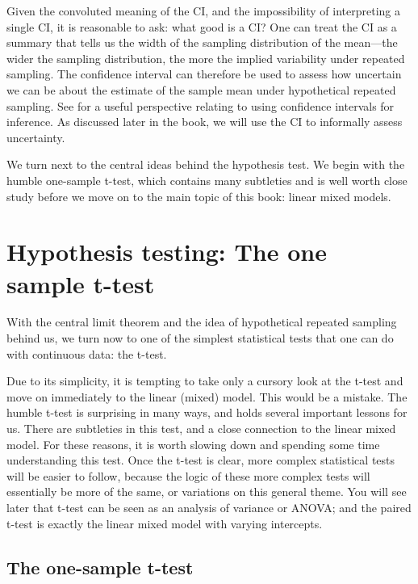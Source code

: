 \documentclass[12pt,]{krantz}
\begin{document}
Given the convoluted meaning of the CI, and the impossibility of interpreting a single CI, it is reasonable to ask: what good is a CI? One can treat the CI as a summary that tells us the width of the sampling distribution of the mean---the wider the sampling distribution, the more the implied variability under repeated sampling. The confidence interval can therefore be used to assess how uncertain we can be about the estimate of the sample mean under hypothetical repeated sampling. See \citet{cumming2014new} for a useful perspective relating to using confidence intervals for inference. As discussed later in the book, we will use the CI to informally assess uncertainty.

We turn next to the central ideas behind the hypothesis test. We begin with the humble one-sample t-test, which contains many subtleties and is well worth close study before we move on to the main topic of this book: linear mixed models.

\hypertarget{hypothesis-testing-the-one-sample-t-test}{%
\section{Hypothesis testing: The one sample t-test}\label{hypothesis-testing-the-one-sample-t-test}}

With the central limit theorem and the idea of hypothetical repeated sampling behind us, we turn now to one of the simplest statistical tests that one can do with continuous data: the t-test.

Due to its simplicity, it is tempting to take only a cursory look at the t-test and move on immediately to the linear (mixed) model. This would be a mistake. The humble t-test is surprising in many ways, and holds several important lessons for us. There are subtleties in this test, and a close connection to the linear mixed model. For these reasons, it is worth slowing down and spending some time understanding this test. Once the t-test is clear, more complex statistical tests will be easier to follow, because the logic of these more complex tests will essentially be more of the same, or variations on this general theme. You will see later that t-test can be seen as an analysis of variance or ANOVA; and the paired t-test is exactly the linear mixed model with varying intercepts.

\hypertarget{the-one-sample-t-test}{%
\subsection{The one-sample t-test}\label{the-one-sample-t-test}}
\end{document}
